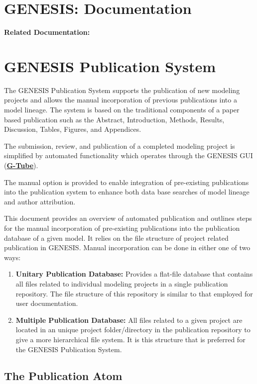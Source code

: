 \documentclass[12pt]{article}
\begin{document}
\section*{GENESIS: Documentation}

{\bf Related Documentation:}

\section*{GENESIS Publication System}

The GENESIS Publication System supports the publication of new modeling projects and allows the manual incorporation of previous publications into a model lineage. The system is based on the traditional components of a paper based publication such as the Abstract, Introduction, Methods, Results, Discussion, Tables, Figures, and Appendices.

The submission, review, and publication of a completed modeling project is simplified by automated functionality which operates through the GENESIS GUI (\href{../gtube/gtube.tex}{\bf G-Tube}). 

The manual option is provided to enable integration of pre-existing publications into the publication system to enhance both data base searches  of model lineage and author attribution.

This document provides an overview of automated publication and outlines steps for the manual incorporation of pre-existing publications into the publication database of a given model. It relies on the file structure of project related publication in GENESIS. Manual incorporation can be done in either one of two ways:
\begin{enumerate}
\item {\bf Unitary Publication Database:} Provides a flat-file database that contains all files related to individual modeling projects in a single publication repository. The file structure of this repository is similar to that employed for user documentation.
\item {\bf Multiple Publication Database:} All files related to a given project are located in an unique project folder/directory in the publication repository to give a more hierarchical file system. It is this structure that is preferred for the GENESIS Publication System.
\end{enumerate}

\subsection*{The Publication Atom}
\end{document}
